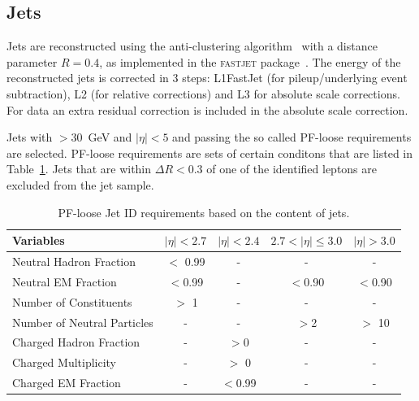 \subsection{Jets}
\label{subsec:jets}
Jets are reconstructed using the anti-\kt clustering algorithm~\cite{antikt}  with a distance parameter $R=0.4$, as implemented in the \textsc{fastjet}  package~\cite{Cacciari:fastjet1,Cacciari:fastjet2}. The energy of the reconstructed jets is corrected in 3 steps: L1FastJet (for pileup/underlying event subtraction), L2 (for relative corrections) and L3 for absolute scale corrections. For data an extra residual correction is included in the absolute scale correction.

Jets with \pt$>$30~GeV and $|\eta|<5$ and passing the so called PF-loose requirements are selected. PF-loose requirements are sets of certain conditons that are listed in Table~\ref{Table:pf-jet-loose-id}. Jets that are within $\Delta R < 0.3$ of one of the identified leptons are excluded from the jet sample. 
%
\begin{table}
\centering
\begin{tabular}[!htbp]{l c c c c}
\hline
{\textbf{Variables}}      &   $|\eta|<2.7$ & $|\eta|<2.4$  & $2.7 < |\eta| \leq 3.0$  & $|\eta| > 3.0$    \\
\hline
Neutral Hadron Fraction   &$   <$ 0.99  & -       & -       & -     \\
Neutral EM Fraction       &   $< $0.99  & -       & $< $0.90  & $< $0.90\\
Number of Constituents    &$   >$ 1     & -       & -       & -     \\
Number of Neutral Particles & -       & -       & $> $2     &$ >$ 10  \\
Charged Hadron Fraction   &   -       & $> $0     & -       & -     \\
Charged Multiplicity      &   -       &$ >$ 0     & -       & -     \\
Charged EM Fraction       &   -       & $< $0.99  & -       & -     \\
\hline
\end{tabular}
\caption{PF-loose Jet ID requirements based on the content of jets.}
\label{Table:pf-jet-loose-id}
\end{table}
%

